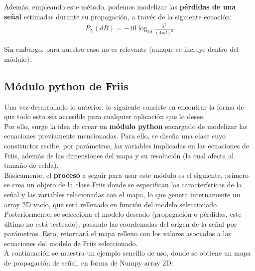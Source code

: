 Además, empleando este método, podemos modelizar las \textbf{pérdidas de una señal} estimadas durante su propagación, a través de la siguiente ecuación:\\

\begin{align}
    P_L(dB) = -10 \log_{10} \frac{\lambda^2}{(4 \pi d)^2}
\end{align}

Sin embargo, para nuestro caso no es relevante (aunque se incluye dentro del módulo).\\

\subsection{Módulo python de Friis}
\label{subsec:friis-module}

Una vez desarrollado lo anterior, lo siguiente consiste en encontrar la forma de que todo esto sea accesible para cualquier aplicación que lo desee.\\

Por ello, surge la idea de crear un \textbf{módulo python} encargado de modelizar las ecuaciones previamente mencionadas. Para ello, se diseña una clase cuyo constructor recibe, por parámetros, las variables implicadas en las ecuaciones de Friis, además de las dimensiones del mapa y su resolución (la cual afecta al tamaño de celda).\\

Básicamente, el \textbf{proceso} a seguir para usar este módulo es el siguiente, primero se crea un objeto de la clase Friis donde se especifican las características de la señal y las variables relacionadas con el mapa, lo que genera internamente un array 2D vacío, que será rellenado en función del modelo seleccionado. Posteriormente, se selecciona el modelo deseado (propagación o pérdidas, este último no está testeado), pasando las coordenadas del origen de la señal por parámetros. Esto, retornará el mapa relleno con los valores asociados a las ecuaciones del modelo de Friis seleccionado.\\

A continuación se muestra un ejemplo sencillo de uso, donde se obtiene un mapa de propagación de señal, en forma de Numpy array 2D:

